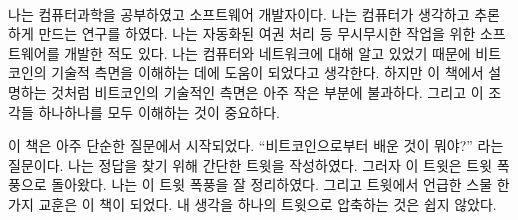 \paragraph{}
나는 컴퓨터과학을 공부하였고 소프트웨어 개발자이다. 
나는 컴퓨터가 생각하고 추론하게 만드는 연구를 하였다.
나는 자동화된 여권 처리 등 무시무시한 작업을 위한 소프트웨어를 개발한 적도 있다. 
나는 컴퓨터와 네트워크에 대해 알고 있었기 때문에 비트코인의 기술적 측면을 이해하는 데에 도움이 되었다고 생각한다. 
하지만 이 책에서 설명하는 것처럼 비트코인의 기술적인 측면은 아주 작은 부분에 불과하다. 
그리고 이 조각들 하나하나를 모두 이해하는 것이 중요하다.


이 책은 아주 단순한 질문에서 시작되었다. 
\enquote{비트코인으로부터 배운 것이 뭐야?} 라는 질문이다.
나는 정답을 찾기 위해 간단한 트윗을 작성하였다. 
그러자 이 트윗은 트윗 폭풍으로 돌아왔다. 나는 이 트윗 폭풍을 잘 정리하였다.
그리고 트윗에서 언급한 스물 한가지 교훈은 이 책이 되었다. 
내 생각을 하나의 트윗으로 압축하는 것은 쉽지 않았다.


